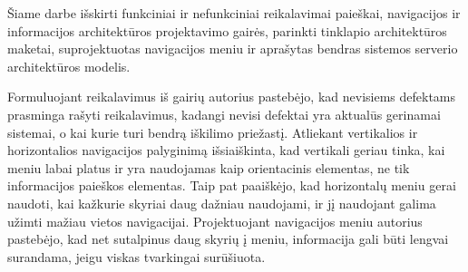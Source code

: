 \documentclass{VUMIFPSkursinis}
\begin{document}


Šiame darbe išskirti funkciniai ir nefunkciniai reikalavimai paieškai, navigacijos ir informacijos architektūros projektavimo gairės, parinkti tinklapio architektūros maketai, suprojektuotas navigacijos meniu ir aprašytas bendras sistemos serverio architektūros modelis.

Formuluojant reikalavimus iš gairių autorius pastebėjo, kad nevisiems defektams prasminga rašyti reikalavimus, kadangi nevisi defektai yra aktualūs gerinamai sistemai, o kai kurie turi bendrą iškilimo priežastį. Atliekant vertikalios ir horizontalios navigacijos palyginimą išsiaiškinta, kad vertikali geriau tinka, kai meniu labai platus ir yra naudojamas kaip orientacinis elementas, ne tik informacijos paieškos elementas. Taip pat paaiškėjo, kad horizontalų meniu gerai naudoti, kai kažkurie skyriai daug dažniau naudojami, ir jį naudojant galima užimti mažiau vietos navigacijai. Projektuojant navigacijos meniu autorius pastebėjo, kad net sutalpinus daug skyrių į meniu, informacija gali būti lengvai surandama, jeigu viskas tvarkingai surūšiuota.



\printbibliography[heading=bibintoc, title=Šaltiniai]  %

\end{document}
